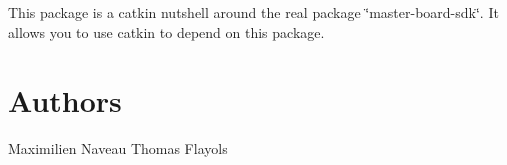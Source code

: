This package is a catkin nutshell around the real package \char`\"{}master-\/board-\/sdk\char`\"{}. It allows you to use catkin to depend on this package.

\section*{Authors}

Maximilien Naveau Thomas Flayols 
